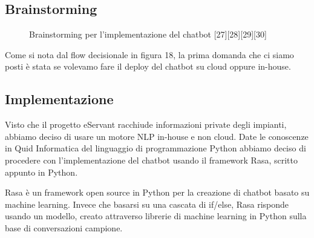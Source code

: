 \subsection{Brainstorming}
\begin{figure}[htp]
    \centering  
    \caption{Brainstorming per l'implementazione del chatbot [27][28][29][30]}
\end{figure}


Come si nota dal flow decisionale in figura 18, la prima domanda che ci siamo posti è stata se volevamo fare il deploy del
chatbot su cloud oppure in-house.\\

\subsection{Implementazione}

\begin{figure}[htp]
    \centering  
\end{figure}

Visto che il progetto eServant racchiude informazioni private degli impianti, abbiamo deciso di usare un motore
NLP in-house e non cloud.
Date le conoscenze in Quid Informatica del linguaggio di programmazione Python abbiamo deciso di procedere
con l'implementazione del chatbot usando il framework Rasa, scritto appunto in Python.

Rasa è un framework open source in Python per la creazione di chatbot basato su machine learning.
Invece che basarsi su una cascata di if/else, Rasa risponde usando un modello, creato attraverso
librerie di machine learning in Python sulla base di conversazioni campione.
